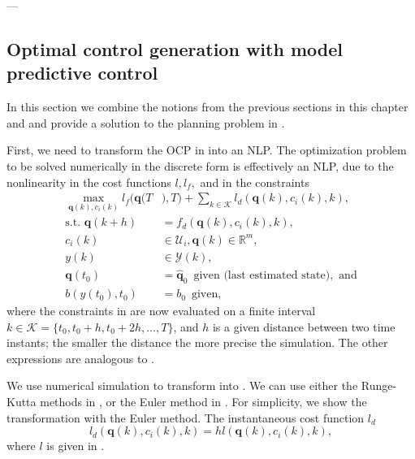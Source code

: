 ---

\subsection{Optimal control generation with model predictive control}
\label{sec:opt-cont-gener}

In this section we combine the notions from the previous sections in this chapter and  and provide a solution to the planning problem in .

First, we need to transform the OCP in  into an NLP. The optimization problem to be solved numerically in the discrete form is effectively an NLP, due to the nonlinearity in the cost functions $l,l_f,$ and in the constraints
\begin{subequations}\label{eq:disc-ocp-output-mpc}\begin{align}
  \max_{\mathbf{q}(k),c_i(k)}{l_f(\mathbf{q}(T}&{),T)+\sum_{k\in\mathcal{K}}{l_d(\mathbf{q}(k),c_i(k),k)}},\\
  \text{s.t. }\mathbf{q}(k+h)&=f_d(\mathbf{q}(k),c_i(k),k),\label{eq:disc-dyn-evol}\\
  c_i(k)&\in\mathcal{U}_i,\mathbf{q}(k)\in\mathbb{R}^m,\label{eq:disc-state-cont-const-mpc}\\
  y(k)&\in\mathcal{Y}(k),\label{eq:disc-batt-const-mpc}\\
  \mathbf{q}(t_0)&=\hat{\mathbf{q}}_0\,\,\,\text{given (last estimated state)},\text{ and}\\
  b(y(t_0),t_0)&=b_0\,\,\,\text{given},
\end{align}\end{subequations}
where the constraints in  are now evaluated on a finite interval $k\in\mathcal{K}=\{t_0,t_0+h,t_0+2h,\dots,T\}$, and $h$ is a given distance between two time instants; the smaller the distance the more precise the simulation. The other expressions are analogous to .

We use numerical simulation to transform  into . We can use either the Runge-Kutta methods in , or the Euler method in . For simplicity, we show the transformation with the Euler method. The instantaneous cost function $l_d$
\begin{equation}
  l_d(\mathbf{q}(k),c_i(k),k)=hl(\mathbf{q}(k),c_i(k),k),
\end{equation}
where $l$ is given in .

